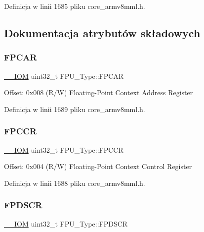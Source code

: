 Definicja w linii 1685 pliku core\+\_\+armv8mml.\+h.



\subsection{Dokumentacja atrybutów składowych}
\mbox{\label{struct_f_p_u___type_a55263b468d0f8e11ac77aec9ff87c820}} 
\subsubsection{\texorpdfstring{F\+P\+C\+AR}{FPCAR}}
{\footnotesize\ttfamily \hyperlink{core__sc300_8h_ab6caba5853a60a17e8e04499b52bf691}{\+\_\+\+\_\+\+I\+OM} uint32\+\_\+t F\+P\+U\+\_\+\+Type\+::\+F\+P\+C\+AR}

Offset\+: 0x008 (R/W) Floating-\/\+Point Context Address Register 

Definicja w linii 1689 pliku core\+\_\+armv8mml.\+h.

\mbox{\label{struct_f_p_u___type_af1b708c5e413739150df3d16ca3b7061}} 
\subsubsection{\texorpdfstring{F\+P\+C\+CR}{FPCCR}}
{\footnotesize\ttfamily \hyperlink{core__sc300_8h_ab6caba5853a60a17e8e04499b52bf691}{\+\_\+\+\_\+\+I\+OM} uint32\+\_\+t F\+P\+U\+\_\+\+Type\+::\+F\+P\+C\+CR}

Offset\+: 0x004 (R/W) Floating-\/\+Point Context Control Register 

Definicja w linii 1688 pliku core\+\_\+armv8mml.\+h.

\mbox{\label{struct_f_p_u___type_a58d1989664a06db6ec2e122eefa9f04a}} 
\subsubsection{\texorpdfstring{F\+P\+D\+S\+CR}{FPDSCR}}
{\footnotesize\ttfamily \hyperlink{core__sc300_8h_ab6caba5853a60a17e8e04499b52bf691}{\+\_\+\+\_\+\+I\+OM} uint32\+\_\+t F\+P\+U\+\_\+\+Type\+::\+F\+P\+D\+S\+CR}

